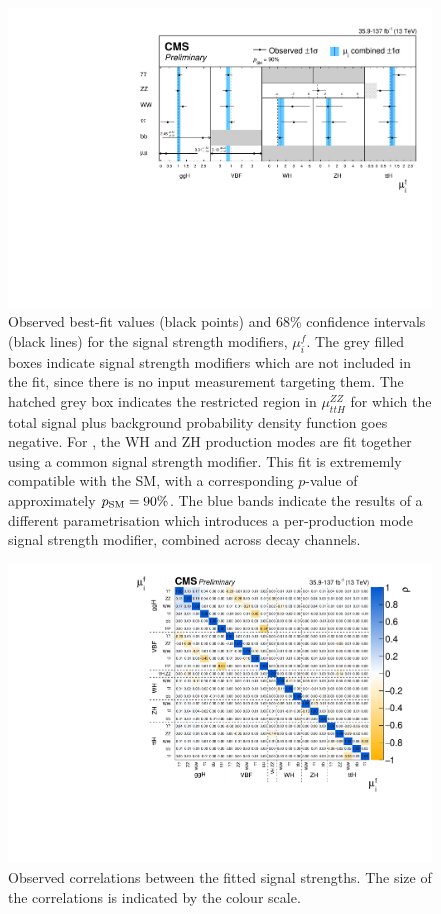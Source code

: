 \begin{figure}[htbp]
  \centering
  \includegraphics[width=.8\textwidth]{Figures/eft/combination_mu.pdf}
  \caption[Results of the combination signal strength fit]
  {
    Observed best-fit values (black points) and 68\% confidence intervals (black lines) for the signal strength modifiers, $\mu_i^f$. The grey filled boxes indicate signal strength modifiers which are not included in the fit, since there is no input measurement targeting them. The hatched grey box indicates the restricted region in $\mu^{ZZ}_{ttH}$ for which the total signal plus background probability density function goes negative. For \HZZ, the WH and ZH production modes are fit together using a common signal strength modifier. This fit is extrememly compatible with the SM, with a corresponding $p$-value of approximately $p_{\rm{SM}}=90\%$. The blue bands indicate the results of a different parametrisation which introduces a per-production mode signal strength modifier, combined across decay channels. 
  }
  \label{fig:combination_mu}
\end{figure}

\begin{figure}[htbp]
  \centering
  \includegraphics[width=.75\textwidth]{Figures/eft/combination_mu_corr.pdf}
  \caption[Correlations in the combination signal strength fit]
  {
    Observed correlations between the fitted signal strengths. The size of the correlations is indicated by the colour scale.
  }
  \label{fig:combination_mu_corr}
\end{figure}

